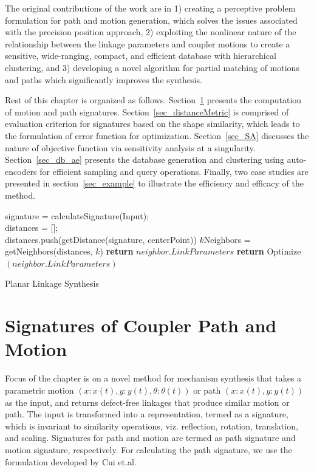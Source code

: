 The original contributions of the work are in 1) creating a perceptive problem formulation for path and motion generation, which solves the issues associated with the precision position approach,
2) exploiting the nonlinear nature of the relationship between the linkage parameters and coupler motions to create a sensitive, wide-ranging, compact, and efficient database with hierarchical clustering, and 3) developing a novel algorithm for partial matching of motions and paths which significantly improves the synthesis.


Rest of this chapter is organized as follows. Section~\ref{sec_sign} presents the computation of motion and path signatures.
Section~\ref{sec_distanceMetric} is comprised of evaluation criterion for signatures based on the shape similarity, which leads to the formulation of error function for optimization.
Section~\ref{sec_SA} discusses the nature of objective function via sensitivity analysis at a singularity.
Section~\ref{sec_db_ae} presents the database generation and clustering using auto-encoders for efficient sampling and query operations.
Finally, two case studies are presented in section~\ref{sec_example} to illustrate the efficiency and efficacy of the method.

\begin{algorithm}
    signature = calculateSignature(Input); \\
    distances = [];\\
    {
      distances.push(getDistance(signature, centerPoint))
    }
    $k$Neighbors = getNeighbors(distances, $k$)
    {
      {
        \textbf{return} $neighbor.LinkParameters$
      }
      {
        \textbf{return} Optimize$(neighbor.LinkParameters)$
      }
    }
    \caption{Planar Linkage Synthesis}
    \label{alg_overall}
\end{algorithm}

\section{Signatures of Coupler Path and Motion}\label{sec_sign}
Focus of the chapter is on a novel method for mechanism synthesis that takes a parametric motion $(x:x(t), y:y(t), \theta:\theta(t))$ or path $(x:x(t), y:y(t))$ as the input, and returns defect-free linkages that produce similar motion or path.
The input is transformed into a representation, termed as a signature, which is invariant to similarity operations, viz. reflection, rotation, translation, and scaling.
Signatures for path and motion are termed as path signature and motion signature, respectively.
For calculating the path signature, we use the formulation developed by Cui et.al\cite{cui2009}.

